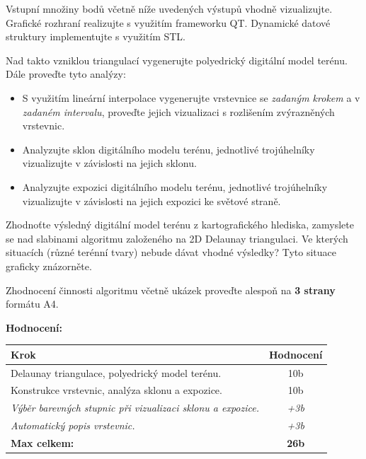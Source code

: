 \documentclass[12pt, a4paper]{article}
\begin{document}
Vstupní množiny bodů včetně níže uvedených výstupů vhodně vizualizujte. Grafické rozhraní realizujte s využitím frameworku QT. Dynamické datové struktury implementujte s využitím STL.

Nad takto vzniklou triangulací vygenerujte polyedrický digitální model terénu. Dále proveďte tyto analýzy:

\begin{itemize}
    \item S využitím lineární interpolace vygenerujte vrstevnice se \textit{zadaným krokem} a v \textit{zadaném intervalu}, proveďte jejich vizualizaci s rozlišením zvýrazněných vrstevnic.
    \item Analyzujte sklon digitálního modelu terénu, jednotlivé trojúhelníky vizualizujte v závislosti na jejich sklonu.
    \item Analyzujte expozici digitálního modelu terénu, jednotlivé trojúhelníky vizualizujte v závislosti na jejich expozici ke světové straně.
\end{itemize}

Zhodnoťte výsledný digitální model terénu z kartografického hlediska, zamyslete se nad slabinami algoritmu založeného na 2D Delaunay triangulaci. Ve kterých situacích (různé terénní tvary) nebude dávat vhodné výsledky? Tyto situace graficky znázorněte.

Zhodnocení činnosti algoritmu včetně ukázek proveďte alespoň na \textbf{3 strany} formátu A4.

\vspace{1em}
\textbf{Hodnocení:}
\vspace{1em}

\begin{small}
\begin{longtable}{|p{15cm}|c|}

\hline
\textbf{Krok} & \textbf{Hodnocení} \\ \hline\hline
Delaunay triangulace, polyedrický model terénu. & 10b \\ \hline
Konstrukce vrstevnic, analýza sklonu a expozice. & 10b \\ \hline
\textit{Výběr barevných stupnic při vizualizaci sklonu a expozice.} & \textit{+3b} \\ \hline
\textit{Automatický popis vrstevnic.} & \textit{+3b} \\ \hline
\textbf{Max celkem:} & \textbf{26b} \\ \hline

\end{longtable}
\end{small}
\end{document}
